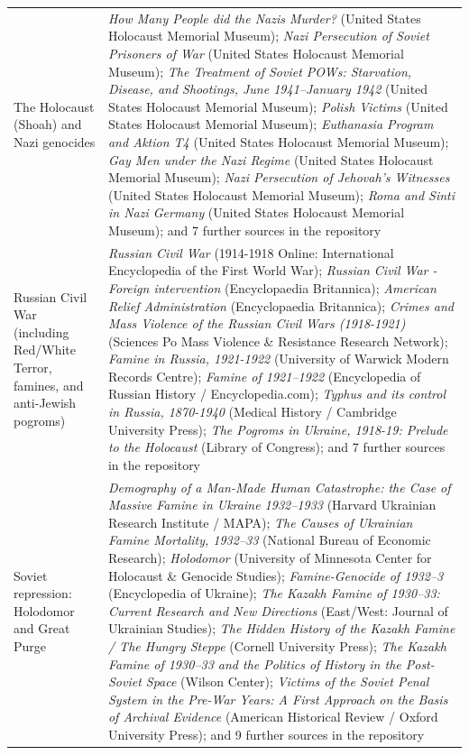\documentclass[11pt]{article}
\begin{document}
\begin{scriptsize}
\begin{longtable}{p{3.5cm} p{12.5cm}}
The Holocaust (Shoah) and Nazi genocides & \emph{How Many People did the Nazis Murder?} (United States Holocaust Memorial Museum); \emph{Nazi Persecution of Soviet Prisoners of War} (United States Holocaust Memorial Museum); \emph{The Treatment of Soviet POWs: Starvation, Disease, and Shootings, June 1941–January 1942} (United States Holocaust Memorial Museum); \emph{Polish Victims} (United States Holocaust Memorial Museum); \emph{Euthanasia Program and Aktion T4} (United States Holocaust Memorial Museum); \emph{Gay Men under the Nazi Regime} (United States Holocaust Memorial Museum); \emph{Nazi Persecution of Jehovah's Witnesses} (United States Holocaust Memorial Museum); \emph{Roma and Sinti in Nazi Germany} (United States Holocaust Memorial Museum); and 7 further sources in the repository \\
\addlinespace
Russian Civil War (including Red/White Terror, famines, and anti-Jewish pogroms) & \emph{Russian Civil War} (1914-1918 Online: International Encyclopedia of the First World War); \emph{Russian Civil War - Foreign intervention} (Encyclopaedia Britannica); \emph{American Relief Administration} (Encyclopaedia Britannica); \emph{Crimes and Mass Violence of the Russian Civil Wars (1918-1921)} (Sciences Po Mass Violence \& Resistance Research Network); \emph{Famine in Russia, 1921-1922} (University of Warwick Modern Records Centre); \emph{Famine of 1921–1922} (Encyclopedia of Russian History / Encyclopedia.com); \emph{Typhus and its control in Russia, 1870-1940} (Medical History / Cambridge University Press); \emph{The Pogroms in Ukraine, 1918-19: Prelude to the Holocaust} (Library of Congress); and 7 further sources in the repository \\
\addlinespace
Soviet repression: Holodomor and Great Purge & \emph{Demography of a Man-Made Human Catastrophe: the Case of Massive Famine in Ukraine 1932–1933} (Harvard Ukrainian Research Institute / MAPA); \emph{The Causes of Ukrainian Famine Mortality, 1932–33} (National Bureau of Economic Research); \emph{Holodomor} (University of Minnesota Center for Holocaust \& Genocide Studies); \emph{Famine-Genocide of 1932–3} (Encyclopedia of Ukraine); \emph{The Kazakh Famine of 1930–33: Current Research and New Directions} (East/West: Journal of Ukrainian Studies); \emph{The Hidden History of the Kazakh Famine / The Hungry Steppe} (Cornell University Press); \emph{The Kazakh Famine of 1930–33 and the Politics of History in the Post-Soviet Space} (Wilson Center); \emph{Victims of the Soviet Penal System in the Pre-War Years: A First Approach on the Basis of Archival Evidence} (American Historical Review / Oxford University Press); and 9 further sources in the repository \\

\end{longtable}
\end{scriptsize}
\end{document}
